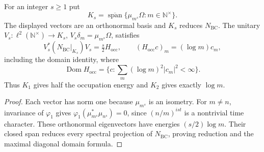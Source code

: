 \begin{proposition}
\label{v4-arith:consumer53:occupation-subspace}
For an integer $s\ge1$ put
\[
 K_s=\overline{\operatorname{span}}
       \{\mu_{m^s}\Omega:m\in\mathbb N^\times\}.
\]
The displayed vectors are an orthonormal basis and $K_s$ reduces
$N_{\mathrm{BC}}$. The unitary
$V_s:\ell^2(\mathbb N^\times)\to K_s$,
$V_s\delta_m=\mu_{m^s}\Omega$, satisfies
\[
 V_s^*(N_{\mathrm{BC}}|_{K_s})V_s=\tfrac s2 H_{\mathrm{occ}},
 \qquad (H_{\mathrm{occ}}c)_m=(\log m)c_m,
\]
including the domain identity, where
\[
 \operatorname{Dom}H_{\mathrm{occ}}
       =\{c:\sum_m(\log m)^2|c_m|^2<\infty\}.
\]
Thus $K_1$ gives half the occupation energy and $K_2$ gives exactly
$\log m$.
\end{proposition}
\begin{proof}
Each vector has norm one because $\mu_{m^s}$ is an isometry.
For $m\ne n$, invariance of $\varphi_1$ gives
$\varphi_1(\mu_{m^s}^*\mu_{n^s})=0$, since $(n/m)^{ist}$ is a nontrivial time character. These orthonormal eigenvectors have energies
$(s/2)\log m$. Their closed span reduces every spectral projection
of $N_{\mathrm{BC}}$, proving reduction and the maximal diagonal
domain formula.
\end{proof}

